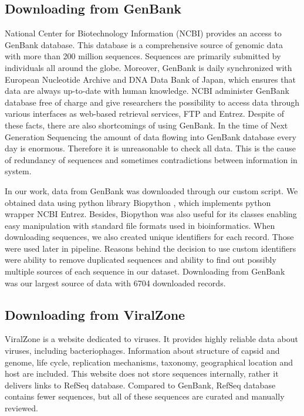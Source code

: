 \subsection{Downloading from GenBank}
National Center for Biotechnology Information (NCBI) provides an access to GenBank\cite{genbank} database.
This database is a comprehensive source of genomic data with more than 200 million sequences.
Sequences are primarily submitted by individuals all around the globe.
Moreover, GenBank is daily synchronized with European Nucleotide Archive and DNA Data Bank of Japan, which ensures that data are always up-to-date with human knowledge.
NCBI administer GenBank database free of charge and give researchers the possibility to access data through various interfaces as web-based retrieval services, FTP and Entrez\cite{entrez}.
Despite of these facts, there are also shortcomings of using GenBank.
In the time of Next Generation Sequencing the amount of data flowing into GenBank database every day is enormous.
Therefore it is unreasonable to check all data.
This is the cause of redundancy of sequences and sometimes contradictions between information in system.

In our work, data from GenBank was downloaded through our custom script.
We obtained data using python library Biopython \cite{biopython}, which implements python wrapper NCBI Entrez.
Besides, Biopython was also useful for its classes enabling easy manipulation with standard file formats used in bioinformatics.
When downloading sequences, we also created unique identifiers for each record.
Those were used later in pipeline.
Reasons behind the decision to use custom identifiers were ability to remove duplicated sequences and ability to find out possibly multiple sources of each sequence in our dataset.
Downloading from GenBank was our largest source of data with 6704 downloaded records.

\subsection{Downloading from ViralZone}
ViralZone is a website dedicated to viruses. 
It provides highly reliable data about viruses, including bacteriophages.
Information about structure of capsid and genome, life cycle, replication mechanisms, taxonomy, geographical location and host are included.
This website does not store sequences internally, rather it delivers links to RefSeq\cite{refseq} database.
Compared to GenBank, RefSeq database contains fewer sequences, but all of these sequences are curated and manually reviewed.

